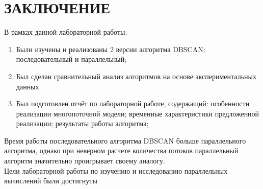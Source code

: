 \chapter*{ЗАКЛЮЧЕНИЕ}

В рамках данной лабораторной работы:

\begin{enumerate}
    \item Были изучены и реализованы 2 версии алгоритма DBSCAN: последовательный и параллельный;
    \item Был сделан сравнительный анализ алгоритмов на основе экспериментальных данных.
    \item Был подготовлен отчёт по лабораторной работе, содержащий: особенности реализации многопоточной модели; 
        временные характеристики предложенной реализации;
        результаты работы алгоритма;
\end{enumerate}
\indent\indent Время работы последовательного алгоритма DBSCAN больше параллельного алгоритма, однако при неверном расчете количества потоков параллельный алгоритм значительно проигрывает своему аналогу.
\\
\indent Цели лабораторной работы по изучению и исследованию параллельных вычислений были достигнуты
